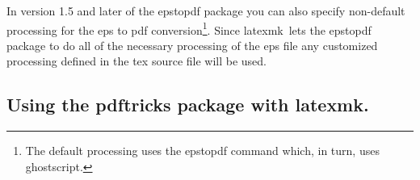 \documentclass[11pt]{article}
\newcommand{\cmd}[1]{\textsf{#1}}
\newcommand{\latexmk}{\textsf{latexmk}}
\begin{document}

In version 1.5 and later of the \cmd{epstopdf} package you can also specify non-default processing for the \cmd{eps} to \cmd{pdf} conversion\footnote{The default processing uses the \cmd{epstopdf} command which, in turn, uses \cmd{ghostscript}.}. Since \latexmk\ lets the \cmd{epstopdf} package to do all of the necessary processing of the \cmd{eps} file any customized processing defined in the \cmd{tex} source file will be used.


\subsection{Using the \cmd{pdftricks} package with \latexmk.}
\end{document}
